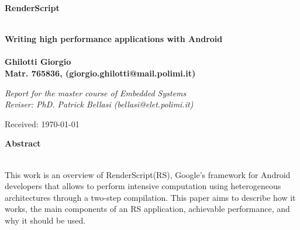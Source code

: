 \documentclass[a4paper,10pt]{article}
\newenvironment*{mytitle}{\begin{LARGE}\bf}{\end{LARGE}\\}%
\newenvironment*{mysubtitle}{\bf}{\\[1.5ex]}%
\newenvironment*{myabstract}{\begin{Large}\bf}{\end{Large}\\[2.5ex]}%
\begin{document}
\begin{mytitle}RenderScript\end{mytitle}
\begin{mysubtitle}Writing high performance applications with Android\end{mysubtitle}
%
%
\\
Ghilotti Giorgio\\
Matr. 765836, (giorgio.ghilotti@mail.polimi.it)\\
\begin{flushright}
\emph{Report for the master course of Embedded Systems}\\
\emph{Reviser: PhD. Patrick Bellasi (bellasi@elet.polimi.it)}
\end{flushright}

Received: \today \\
\hspace{10ex}

\begin{myabstract} Abstract \end{myabstract}
This work is an overview of RenderScript(RS), Google's framework for Android developers that allows to perform intensive computation using heterogeneous architectures through a two-step compilation. This paper aims to describe how it works, the main components of an RS application, achievable performance, and why it should be used.
\end{document}
